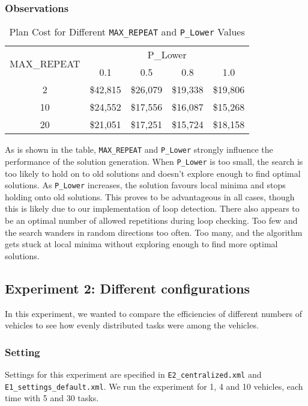 \documentclass[11pt]{article}
\begin{document}
\subsubsection{Observations}


\begin{table}
	\centering
	\caption{Plan Cost for Different \texttt{MAX\_REPEAT} and \texttt{P\_Lower} Values}
	\begin{tabular}{|c|c|c|c|c|}
		\hline
		\multirow{2}{*}{MAX\_REPEAT} & \multicolumn{4}{c|}{P\_Lower} \\ \cline{2-5} 
		& 0.1 & 0.5 & 0.8 & 1.0 \\ \hline
		2 & \$42,815 & \$26,079 & \$19,338 & \$19,806 \\ \hline
		10 & \$24,552 & \$17,556 & \$16,087 & \$15,268 \\ \hline
		20 & \$21,051 & \$17,251 & \$15,724 & \$18,158 \\ \hline
	\end{tabular}
\end{table}


As is shown in the table, \texttt{MAX\_REPEAT} and \texttt{P\_Lower} strongly influence the performance of the solution generation. When \texttt{P\_Lower} is too small, the search is too likely to hold on to old solutions and doesn't explore enough to find optimal solutions. As \texttt{P\_Lower} increases, the solution favours local minima and stops holding onto old solutions. This proves to be advantageous in all cases, though this is likely due to our implementation of loop detection. There also appears to be an optimal number of allowed repetitions during loop checking. Too few and the search wanders in random directions too often. Too many, and the algorithm gets stuck at local minima without exploring enough to find more optimal solutions.

\subsection{Experiment 2: Different configurations}
In this experiment, we wanted to compare the efficiencies of different numbers of vehicles to see how evenly distributed tasks were among the vehicles. 
\subsubsection{Setting}
Settings for this experiment are specified in \texttt{E2\_centralized.xml} and \texttt{E1\_settings\_default.xml}. We run the experiment for 1, 4 and 10 vehicles, each time with 5 and 30 tasks.\\
\end{document}
